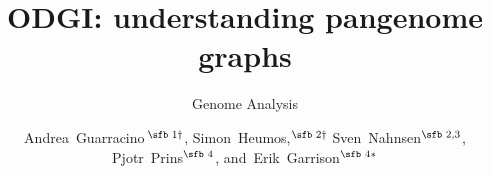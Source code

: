 \documentclass{bioinfo}
\begin{document}

\subtitle{Genome Analysis}

\title[ODGI: understanding pangenome graphs]{ODGI: understanding pangenome graphs}
\author[Guarracino, Heumos \textit{et~al}.]{
Andrea~Guarracino\,$^{\text{\sfb 1} \dagger}$,
Simon~Heumos,$^{\text{\sfb 2} \dagger}$
Sven~Nahnsen$^{\text{\sfb 2,3}}$, \\
Pjotr~Prins$^{\text{\sfb 4}}$,
and~Erik~Garrison$^{\text{\sfb 4}*}$
}

\address{
$^{\text{\sf 1}}$Genomics Research Centre, Human Technopole, Viale Rita Levi‑Montalcini 1, Milan, 20157, Italy \\
$^{\text{\sf 2}}$Quantitative Biology Center (QBiC), University of T\"ubingen, T\"ubingen, 72076, Germany \\
$^{\text{\sf 3}}$Biomedical Data Science, Dept. of Computer Science, University of T\"ubingen, T\"ubingen, Germany, 72076 \\
$^{\text{\sf 4}}$Department of Genetics, Genomics and Informatics, University of Tennessee Health Science Center, Memphis, 38163, Tennessee, USA
}




\end{document}
